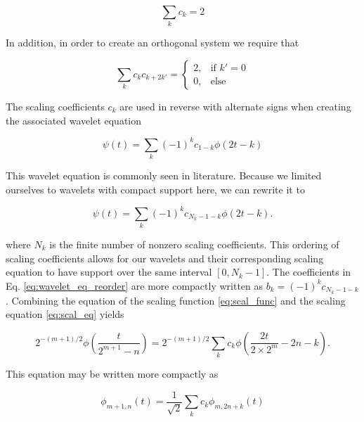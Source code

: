 \begin{equation}
    \sum_k c_k = 2
    \label{eq:scaling_coeff_constr}
\end{equation}

In addition, in order to create an orthogonal system we require that 

\begin{equation}
    \sum_k c_k c_{k+2k'} = \begin{cases}
        2, & \text{if } k' = 0 \\
        0, & \text{else } 
    \end{cases}
\end{equation}

The scaling coefficients $c_k$ are used in reverse with alternate signs when creating the associated wavelet equation

\begin{equation}
    \psi(t) = \sum_k (-1)^k c_{1-k} \phi(2t-k)
    \label{eq:wavelet_eq}
\end{equation}

This wavelet equation is commonly seen in literature. Because we limited ourselves to wavelets with compact support here, we can rewrite it to

\begin{equation}
    \psi(t) = \sum_k (-1)^k c_{N_k - 1 - k} \phi(2t - k).
    \label{eq:wavelet_eq_reorder}
\end{equation}

where $N_k$ is the finite number of nonzero scaling coefficients. This ordering of scaling coefficients allows for our wavelets and their corresponding scaling equation
to have support over the same interval $[0, N_k -1 ]$. The coefficients in Eq. \ref{eq:wavelet_eq_reorder} are more compactly written as $b_k=(-1)^kc_{N_k - 1 - k}$.
Combining the equation of the scaling function \ref{eq:scal_func} and the scaling equation \ref{eq:scal_eq} yields

\begin{equation}
    2^{-(m+1)/2} \phi \left(\frac{t}{2^{m+1} - n}\right) = 2^{-(m+1)/2} \sum_k c_k \phi \left(\frac{2t}{2 \times 2^m} -2n - k\right).
\end{equation}

This equation may be written more compactly as

\begin{equation}
    \phi_{m+1, n}(t) = \frac{1}{\sqrt{2}} \sum_k c_k \phi_{m, 2n+k}(t)
    \label{eq:scal_multires}
\end{equation}

